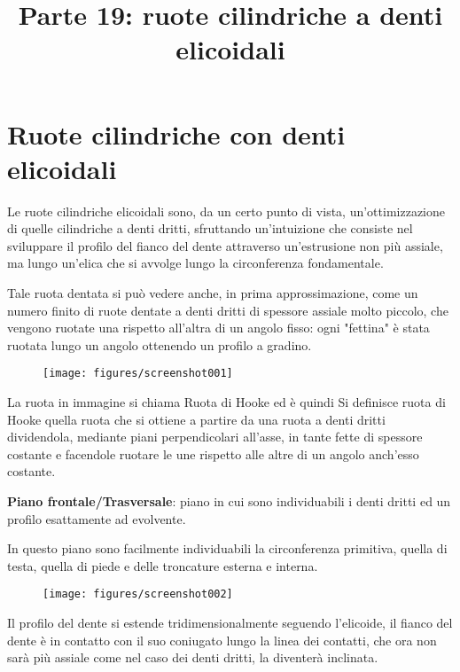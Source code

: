\documentclass[a4paper, 15pt]{article}
\title{Parte 19: ruote cilindriche a denti elicoidali}
\date{}
\begin{document}
\maketitle
{}
\setcounter{tocdepth}{5}  %
\tableofcontents 
\newpage



\section{Ruote cilindriche con denti elicoidali}
\begin{adjustwidth}{2in}{}
		Le ruote cilindriche elicoidali sono, da un certo punto di vista, un'ottimizzazione di quelle cilindriche a denti dritti, sfruttando un'intuizione che consiste nel sviluppare il profilo del fianco del dente attraverso un'estrusione non più assiale, ma lungo un'elica che si avvolge lungo la circonferenza fondamentale. \newline 
		
		Tale ruota dentata si può vedere anche, in prima approssimazione, come un numero finito di ruote dentate a denti dritti di spessore assiale molto piccolo, che vengono ruotate una rispetto all'altra di un angolo fisso: ogni "fettina" è stata ruotata lungo un angolo ottenendo un profilo a gradino. 
		\begin{figure}[H]
			\centering
			\texttt{[image: figures/screenshot001]}
			\label{fig:screenshot001}
		\end{figure}
		La ruota in immagine si chiama Ruota di Hooke ed è quindi Si definisce ruota di Hooke quella ruota che si ottiene a partire da una ruota a denti dritti dividendola, mediante
		piani perpendicolari all’asse, in tante fette di spessore costante e facendole ruotare le une rispetto alle altre di un
		angolo anch’esso costante.\newline 
		
	 	\textbf{Piano frontale/Trasversale}: piano in cui sono individuabili i denti dritti ed un profilo esattamente ad evolvente. 
	 	
	 	In questo piano sono facilmente individuabili la circonferenza primitiva, quella di testa, quella di piede e delle troncature esterna e interna.  
	 	\begin{figure}[H]
	 		\centering
	 		\texttt{[image: figures/screenshot002]}
	 		\label{fig:screenshot002}
	 	\end{figure}	 	
	 	Il profilo del dente si estende tridimensionalmente seguendo l'elicoide, il fianco del dente è in contatto con il suo coniugato lungo la linea dei contatti, che ora non sarà più assiale come nel caso dei denti dritti, la diventerà inclinata. \newline 
		

\end{adjustwidth}
\end{document}

